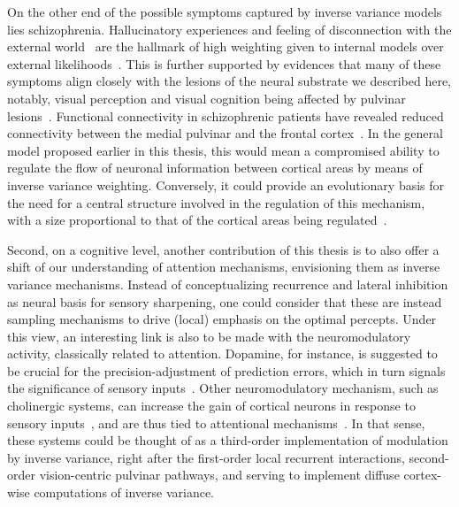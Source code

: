 On the other end of the possible symptoms captured by inverse variance models lies schizophrenia. Hallucinatory experiences and feeling of disconnection with the external world~\cite{insel2010rethinking} are the hallmark of high weighting given to internal models over external likelihoods~\cite{sterzer2018predictive}. This is further supported by evidences that many of these symptoms align closely with the lesions of the neural substrate we described here, notably, visual perception and visual cognition being affected by pulvinar lesions~\cite{dorph2017postmortem}. Functional connectivity in schizophrenic patients have revealed reduced connectivity between the medial pulvinar and the frontal cortex~\cite{penner2018higher,yamamoto2018aberrant}. In the general model proposed earlier in this thesis, this would mean a compromised ability to regulate the flow of neuronal information between cortical areas by means of inverse variance weighting. Conversely, it could provide an evolutionary basis for the need for a central structure involved in the regulation of this mechanism, with a size proportional to that of the cortical areas being regulated~\cite{casanova2004functions}.

Second, on a cognitive level, another contribution of this thesis is to also offer a shift of our understanding of attention mechanisms, envisioning them as inverse variance mechanisms. Instead of conceptualizing recurrence and lateral inhibition as neural basis for sensory sharpening, one could consider that these are instead sampling mechanisms to drive (local) emphasis on the optimal percepts. 
Under this view, an interesting link is also to be made with the neuromodulatory activity, classically related to attention. Dopamine, for instance, is suggested to be crucial for the precision-adjustment of prediction errors, which in turn signals the significance of sensory inputs~\cite{fiorillo2008temporal, schultz1997neural}. Other neuromodulatory mechanism, such as cholinergic systems, can increase the gain of cortical neurons in response to sensory inputs~\cite{vaucher1997cholinergic, brown2011active}, and are thus tied to attentional mechanisms~\cite{kang2014boosting}. In that sense, these systems could be thought of as a third-order implementation of modulation by inverse variance, right after the first-order local recurrent interactions, second-order vision-centric pulvinar pathways, and serving to implement diffuse cortex-wise computations of inverse variance. 

